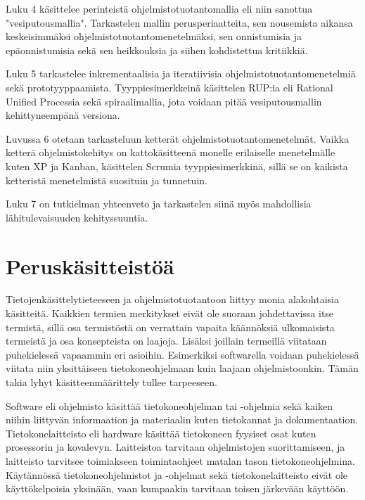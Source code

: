 \documentclass[finnish,12pt]{tktltiki2}
\theoremstyle{definition}
\theoremstyle{remark}
\begin{document}
Luku 4 käsittelee perinteistä ohjelmistotuotantomallia eli niin sanottua "vesiputousmallia". Tarkastelen mallin perusperiaatteita, sen nousemista aikansa keskeisimmäksi ohjelmistotuotantomenetelmäksi, sen onnistumisia ja epäonnistumisia sekä sen heikkouksia ja siihen kohdistettua kritiikkiä.

Luku 5 tarkastelee inkrementaalisia ja iteratiivisia ohjelmistotuotantomenetelmiä sekä prototyyppaamista. Tyyppiesimerkkeinä käsittelen RUP:ia eli Rational Unified Processia sekä spiraalimallia, jota voidaan pitää vesiputousmallin kehittyneempänä versiona.

Luvussa 6 otetaan tarkasteluun ketterät ohjelmistotuotantomenetelmät. Vaikka ketterä ohjelmistokehitys on kattokäsitteenä monelle erilaiselle menetelmälle kuten XP ja Kanban, käsittelen Scrumia tyyppiesimerkkinä, sillä se on kaikista ketteristä menetelmistä suosituin ja tunnetuin.

Luku 7 on tutkielman yhteenveto ja tarkastelen siinä myös mahdollisia lähitulevaisuuden kehityssuuntia.

\section{Peruskäsitteistöä}
Tietojenkäsittelytieteeseen ja ohjelmistotuotantoon liittyy monia alakohtaisia käsitteitä. Kaikkien termien merkitykset eivät ole suoraan johdettavissa itse termistä, sillä osa termistöstä on verrattain vapaita käännöksiä ulkomaisista termeistä ja osa konsepteista on laajoja. Lisäksi joillain termeillä viitataan puhekielessä  vapaammin eri asioihin. Esimerkiksi softwarella voidaan puhekielessä viitata niin yksittäiseen tietokoneohjelmaan kuin laajaan ohjelmistoonkin. Tämän takia lyhyt käsitteenmäärittely tullee tarpeeseen.

Software eli ohjelmisto käsittää tietokoneohjelman tai -ohjelmia sekä kaiken niihin liittyvän informaation ja materiaalin kuten tietokannat ja dokumentaation. \newline Tietokonelaitteisto eli hardware käsittää tietokoneen fyysiset osat kuten prosessorin ja kovalevyn. Laitteistoa tarvitaan ohjelmistojen suorittamiseen, ja laitteisto tarvitsee toimiakseen toimintaohjeet matalan tason tietokoneohjelmina. Käytännössä tietokoneohjelmistot ja -ohjelmat sekä tietokonelaitteisto eivät ole käyttökelpoisia yksinään, vaan kumpaakin tarvitaan toisen järkevään käyttöön.
\end{document}
